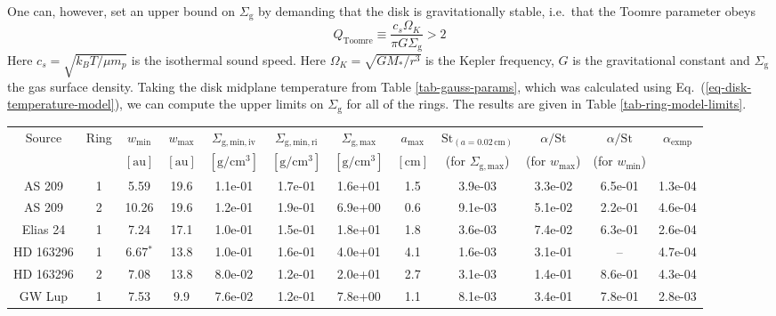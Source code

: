 \documentclass{aa}
\begin{document}
One can, however, set an upper bound on $\Sigma_{\mathrm{g}}$ by demanding that
the disk is gravitationally stable, i.e.\ that the Toomre parameter obeys
\begin{equation}
Q_{\mathrm{Toomre}}\equiv \frac{c_s\Omega_K}{\pi G \Sigma_{\mathrm{g}}} >2
\end{equation}
Here $c_s=\sqrt{k_BT/\mu m_p}$ is the isothermal sound speed. Here
$\Omega_K=\sqrt{GM_{*}/r^3}$ is the Kepler frequency,
$G$ is the gravitational constant and $\Sigma_{\mathrm{g}}$ the gas
surface density. Taking the disk midplane
temperature from Table \ref{tab-gauss-params}, which was calculated using
Eq.~(\ref{eq-disk-temperature-model}), we can compute the upper limits on
$\Sigma_{\mathrm{g}}$ for all of the rings. The results are given in Table
\ref{tab-ring-model-limits}.

\begin{table*}
\begin{center}
\begin{tabular}{|cc|ccccccc|ccc|}
\hline
\hline
Source     & Ring & $w_{\mathrm{min}}$ & $w_{\mathrm{max}}$ & $\Sigma_{\mathrm{g,min,iv}}$ & $\Sigma_{\mathrm{g,min,ri}}$ & $\Sigma_{\mathrm{g,max}}$ & $a_{\mathrm{max}}$ & $\mathrm{St}_{(a=0.02\,\mathrm{cm})}$ & $\alpha/\mathrm{St}$ & $\alpha/\mathrm{St}$ & $\alpha_{\mathrm{exmp}}$\\
           &      & $[\mathrm{au}]$  & $[\mathrm{au}]$  & $[\mathrm{g}/\mathrm{cm}^3]$ & $[\mathrm{g}/\mathrm{cm}^3]$ & $[\mathrm{g}/\mathrm{cm}^3]$ & $[\mathrm{cm}]$ & (for $\Sigma_{\mathrm{g,max}}$)& (for $w_\mathrm{max}$) & (for $w_\mathrm{min}$) &   \\
\hline
AS 209     & 1 &  5.59 & 19.6 & 1.1e-01 & 1.7e-01 & 1.6e+01 &  1.5 & 3.9e-03 & 3.3e-02 & 6.5e-01 & 1.3e-04\\
AS 209     & 2 & 10.26 & 19.6 & 1.2e-01 & 1.9e-01 & 6.9e+00 &  0.6 & 9.1e-03 & 5.1e-02 & 2.2e-01 & 4.6e-04\\
Elias 24   & 1 &  7.24 & 17.1 & 1.0e-01 & 1.5e-01 & 1.8e+01 &  1.8 & 3.6e-03 & 7.4e-02 & 6.3e-01 & 2.6e-04\\
HD 163296  & 1 &  6.67$^{*}$ & 13.8 & 1.0e-01 & 1.6e-01 & 4.0e+01 &  4.1 & 1.6e-03 & 3.1e-01 & -- & 4.7e-04\\
HD 163296  & 2 &  7.08 & 13.8 & 8.0e-02 & 1.2e-01 & 2.0e+01 &  2.7 & 3.1e-03 & 1.4e-01 & 8.6e-01 & 4.3e-04\\
GW Lup     & 1 &  7.53 &  9.9 & 7.6e-02 & 1.2e-01 & 7.8e+00 &  1.1 & 8.1e-03 & 3.4e-01 & 7.8e-01 & 2.8e-03\\

\end{tabular}
\end{center}
\end{table*}
\end{document}

